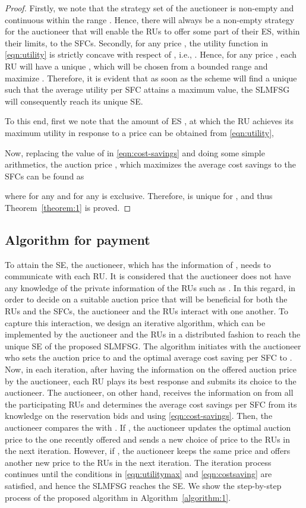 \documentclass[journal,10pt]{IEEEtran}
\begin{document}
\begin{proof}
Firstly, we note that the strategy set of the auctioneer is non-empty and continuous within the range . Hence, there will always be a non-empty strategy for the auctioneer that will enable the RUs to offer some part of their ES, within their limits, to the SFCs. Secondly, for any price , the utility function  in \eqref{eqn:utility} is strictly concave with respect of , i.e., . Hence, for any price , each RU will have a unique , which will be chosen from a bounded range  and maximize . Therefore, it is evident that as soon as the scheme will find a unique  such that the average utility  per SFC attains a maximum value, the SLMFSG  will consequently reach its unique SE.

To this end, first we note that the amount of ES , at which the RU  achieves its maximum utility in response to a price  can be obtained from \eqref{eqn:utility},

Now, replacing the value of  in \eqref{eqn:cost-savings} and doing some simple arithmetics, the auction price , which maximizes the average cost savings to the SFCs  can be found as

where  for any  and  for any  is exclusive. Therefore,  is unique for , and thus Theorem~\ref{theorem:1} is proved.
\end{proof}
\subsection {Algorithm for payment}\label{sec:algorithm}
\hspace{1mm}To attain the SE, the auctioneer, which has the information of , needs to communicate with each RU. It is considered that the auctioneer does not have any knowledge of the private information of the RUs such as . In this regard, in order to decide on a suitable auction price  that will be beneficial for both the RUs and the SFCs, the auctioneer and the RUs interact with one another. To capture this interaction, we design an iterative algorithm, which can be implemented by the auctioneer and the RUs in a distributed fashion to reach the unique SE of the proposed SLMFSG. The algorithm initiates with the auctioneer who sets the auction price  to  and the optimal average cost saving per SFC  to . Now, in each iteration, after having the information on the offered auction price by the auctioneer, each RU  plays its best response  and submits its choice to the auctioneer. The auctioneer, on other hand, receives the information on  from all the participating RUs and determines the average cost savings per SFC  from its knowledge on the reservation bids  and using \eqref{eqn:cost-savings}. Then, the auctioneer compares the  with . If , the auctioneer updates the optimal auction price to the one recently offered and sends a new choice of price to the RUs in the next iteration. However, if , the auctioneer keeps the same price and offers another new price to the RUs in the next iteration. The iteration process continues until the conditions in \eqref{eqn:utilitymax} and \eqref{eqn:costsaving} are satisfied, and hence the SLMFSG reaches the SE. We show the step-by-step process of the proposed algorithm in Algorithm~\ref{algorithm:1}.
\end{document}
